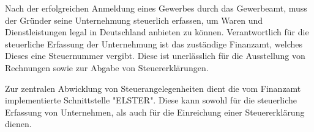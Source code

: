 
Nach der erfolgreichen Anmeldung eines Gewerbes durch das Gewerbeamt, muss der Gründer seine Unternehmung 
steuerlich erfassen, um Waren und Dienstleistungen legal in Deutschland anbieten zu können. Verantwortlich für
die steuerliche Erfassung der Unternehmung ist das zuständige Finanzamt, welches Dieses eine Steuernummer vergibt. 
Diese ist unerlässlich für die Ausstellung von Rechnungen sowie zur Abgabe von Steuererklärungen.

Zur zentralen Abwicklung von Steuerangelegenheiten dient die vom Finanzamt implementierte Schnittstelle "ELSTER".
Diese kann sowohl für die steuerliche Erfassung von Unternehmen, als auch für die Einreichung einer Steuererklärung dienen.